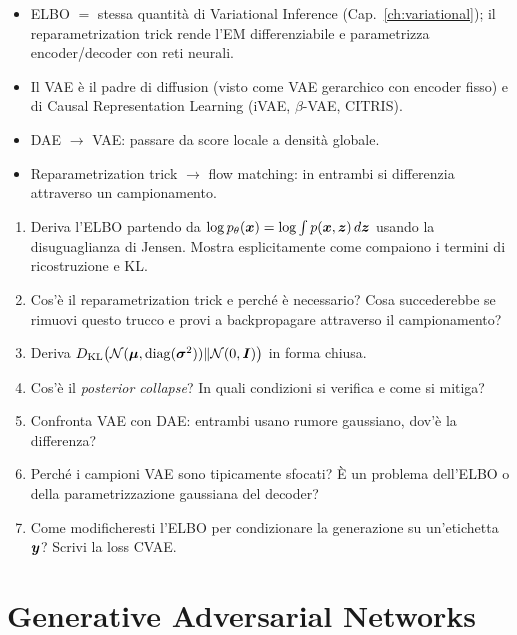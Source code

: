 \begin{tcolorbox}[mybox, title={Connessioni}]
\begin{itemize}
  \item ELBO $=$ stessa quantità di Variational Inference (Cap.~\ref{ch:variational}); il reparametrization trick rende l'EM differenziabile e parametrizza encoder/decoder con reti neurali.
  \item Il VAE è il padre di diffusion (visto come VAE gerarchico con encoder fisso) e di Causal Representation Learning (iVAE, $\beta$-VAE, CITRIS).
  \item DAE $\to$ VAE: passare da score locale a densità globale.
  \item Reparametrization trick $\to$ flow matching: in entrambi si differenzia attraverso un campionamento.
\end{itemize}
\end{tcolorbox}

\begin{tcolorbox}[mywarn, title={Domande d'esame — VAE}]
\begin{enumerate}
  \item Deriva l'ELBO partendo da $\log p_\theta(\bm{x}) = \log \int p(\bm{x},\bm{z})\,d\bm{z}$ usando la disuguaglianza di Jensen. Mostra esplicitamente come compaiono i termini di ricostruzione e KL.
  \item Cos'è il reparametrization trick e perché è necessario? Cosa succederebbe se rimuovi questo trucco e provi a backpropagare attraverso il campionamento?
  \item Deriva $D_{\mathrm{KL}}\!\left(\mathcal{N}(\boldsymbol{\mu}, \mathrm{diag}(\boldsymbol{\sigma}^2)) \| \mathcal{N}(0,\bm{I})\right)$ in forma chiusa.
  \item Cos'è il \emph{posterior collapse}? In quali condizioni si verifica e come si mitiga?
  \item Confronta VAE con DAE: entrambi usano rumore gaussiano, dov'è la differenza?
  \item Perché i campioni VAE sono tipicamente sfocati? È un problema dell'ELBO o della parametrizzazione gaussiana del decoder?
  \item Come modificheresti l'ELBO per condizionare la generazione su un'etichetta $\bm{y}$? Scrivi la loss CVAE.
\end{enumerate}
\end{tcolorbox}

\chapter{Generative Adversarial Networks}
\label{ch:gan}

